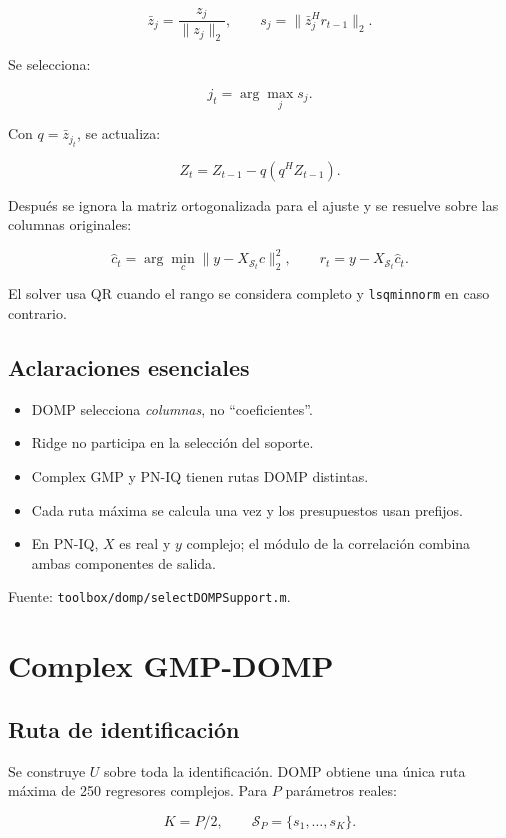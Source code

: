 \documentclass[10pt,a4paper]{article}
\newcommand{\code}[1]{\texttt{#1}}
\begin{document}
\[
\bar z_j=\frac{z_j}{\|z_j\|_2},
\qquad
s_j=\|\bar z_j^H r_{t-1}\|_2.
\]

Se selecciona:

\[
j_t=\arg\max_j s_j.
\]

Con \(q=\bar z_{j_t}\), se actualiza:

\[
Z_t=Z_{t-1}-q(q^H Z_{t-1}).
\]

Después se ignora la matriz ortogonalizada para el ajuste y se resuelve sobre
las columnas originales:

\[
\hat c_t
=\arg\min_c\|y-X_{\mathcal S_t}c\|_2^2,
\qquad
r_t=y-X_{\mathcal S_t}\hat c_t.
\]

El solver usa QR cuando el rango se considera completo y
\code{lsqminnorm} en caso contrario.

\subsection{Aclaraciones esenciales}

\begin{itemize}[leftmargin=*]
\item DOMP selecciona \emph{columnas}, no ``coeficientes''.
\item Ridge no participa en la selección del soporte.
\item Complex GMP y PN-IQ tienen rutas DOMP distintas.
\item Cada ruta máxima se calcula una vez y los presupuestos usan prefijos.
\item En PN-IQ, \(X\) es real y \(y\) complejo; el módulo de la correlación
combina ambas componentes de salida.
\end{itemize}

Fuente: \code{toolbox/domp/selectDOMPSupport.m}.

\section{Complex GMP-DOMP}

\subsection{Ruta de identificación}

Se construye \(U\) sobre toda la identificación. DOMP obtiene una única ruta
máxima de 250 regresores complejos. Para \(P\) parámetros reales:

\[
K=P/2,\qquad
\mathcal S_P=\{s_1,\ldots,s_K\}.
\]
\end{document}
